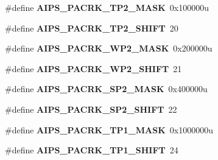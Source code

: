 \begin{DoxyCompactItemize}
\item 
\hypertarget{group___a_i_p_s___register___masks_gad4133f2128f9c9def47322e8f70707d2}{}\#define {\bfseries A\+I\+P\+S\+\_\+\+P\+A\+C\+R\+K\+\_\+\+T\+P2\+\_\+\+M\+A\+S\+K}~0x100000u\label{group___a_i_p_s___register___masks_gad4133f2128f9c9def47322e8f70707d2}

\item 
\hypertarget{group___a_i_p_s___register___masks_ga689872c13b85beaa787d9988c754e4a0}{}\#define {\bfseries A\+I\+P\+S\+\_\+\+P\+A\+C\+R\+K\+\_\+\+T\+P2\+\_\+\+S\+H\+I\+F\+T}~20\label{group___a_i_p_s___register___masks_ga689872c13b85beaa787d9988c754e4a0}

\item 
\hypertarget{group___a_i_p_s___register___masks_ga8d9748a860696928dec608b3ad5b8fc1}{}\#define {\bfseries A\+I\+P\+S\+\_\+\+P\+A\+C\+R\+K\+\_\+\+W\+P2\+\_\+\+M\+A\+S\+K}~0x200000u\label{group___a_i_p_s___register___masks_ga8d9748a860696928dec608b3ad5b8fc1}

\item 
\hypertarget{group___a_i_p_s___register___masks_ga91382e195d86100bc0edd1f79f3d4685}{}\#define {\bfseries A\+I\+P\+S\+\_\+\+P\+A\+C\+R\+K\+\_\+\+W\+P2\+\_\+\+S\+H\+I\+F\+T}~21\label{group___a_i_p_s___register___masks_ga91382e195d86100bc0edd1f79f3d4685}

\item 
\hypertarget{group___a_i_p_s___register___masks_gac8d3b5e60dc3c7d2d6131718ed5a63c8}{}\#define {\bfseries A\+I\+P\+S\+\_\+\+P\+A\+C\+R\+K\+\_\+\+S\+P2\+\_\+\+M\+A\+S\+K}~0x400000u\label{group___a_i_p_s___register___masks_gac8d3b5e60dc3c7d2d6131718ed5a63c8}

\item 
\hypertarget{group___a_i_p_s___register___masks_ga5ea3923a30c7eb82e8983ad44ca18fb2}{}\#define {\bfseries A\+I\+P\+S\+\_\+\+P\+A\+C\+R\+K\+\_\+\+S\+P2\+\_\+\+S\+H\+I\+F\+T}~22\label{group___a_i_p_s___register___masks_ga5ea3923a30c7eb82e8983ad44ca18fb2}

\item 
\hypertarget{group___a_i_p_s___register___masks_ga7168a15a7f6a530a110837dcd79135ee}{}\#define {\bfseries A\+I\+P\+S\+\_\+\+P\+A\+C\+R\+K\+\_\+\+T\+P1\+\_\+\+M\+A\+S\+K}~0x1000000u\label{group___a_i_p_s___register___masks_ga7168a15a7f6a530a110837dcd79135ee}

\item 
\hypertarget{group___a_i_p_s___register___masks_ga679e6b6ddf543077e521b4aee8f758d6}{}\#define {\bfseries A\+I\+P\+S\+\_\+\+P\+A\+C\+R\+K\+\_\+\+T\+P1\+\_\+\+S\+H\+I\+F\+T}~24\label{group___a_i_p_s___register___masks_ga679e6b6ddf543077e521b4aee8f758d6}


\end{DoxyCompactItemize}
